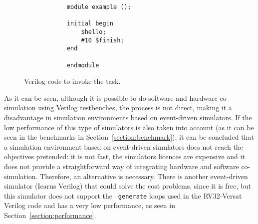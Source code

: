 \lstset{language=Verilog}
\begin{figure}[!htb]
	\begin{minipage}{\linewidth}
		\begin{spacing}{0.7}
			\begin{lstlisting}
			module example ();
			
			initial begin
				$hello;
				#10 $finish;
			end
			   	  
			endmodule
			\end{lstlisting}
		\end{spacing}
	\end{minipage}
	\vspace*{-10mm}
	\caption{Verilog code to invoke the task.}
	\label{fig:vpi_verilog}
\end{figure}

As it can be seen, although it is possible to do software and hardware
co-simulation using Verilog testbenches, the process is not direct, making it a
disadvantage in simulation environments based on event-driven simulators. If the
low performance of this type of simulators is also taken into account (as it can
be seen in the benchmarks in Section~\ref{section:benchmark}), it can be
concluded that a simulation environment based on event-driven simulators does
not reach the objectives pretended: it is not fast, the simulators licences are
expensive and it does not provide a straightforward way of integrating hardware
and software co-simulation. Therefore, an alternative is necessary.  There is
another event-driven simulator (Icarus Verilog) that could solve the cost
problems, since it is free, but this simulator does not support the {\tt
  generate} loops used in the RV32-Versat Verilog code and has a very low
performance, as seen in Section~\ref{section:performance}.


